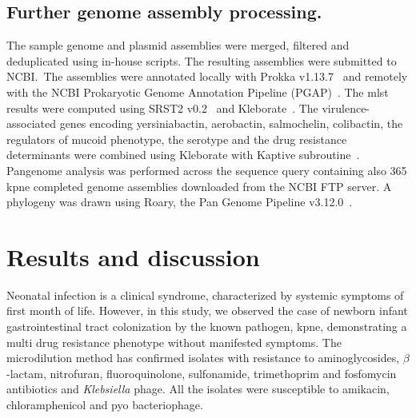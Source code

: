 \documentclass[12pt,a4paper]{article}
\newcommand{\betalactam}{$\beta$-lactam}
\begin{document}
\subsection{Further genome assembly processing.}\label{subsec:proc_ass}
The sample genome and plasmid assemblies were merged, filtered and deduplicated using in-house scripts.
The resulting assemblies were submitted to NCBI.\
The assemblies were annotated locally with Prokka v1.13.7~\cite{Prokka}
and remotely with the NCBI Prokaryotic Genome Annotation Pipeline (PGAP)~\cite{PGAP}.
The \gls{mlst} results were computed using SRST2 v0.2~\cite{SRST2}
and Kleborate~\cite{Kleborate}.
The virulence-associated genes encoding yersiniabactin, aerobactin, salmochelin, colibactin, the regulators of mucoid
phenotype, the serotype and the drug resistance determinants were combined using Kleborate with
Kaptive subroutine~\cite{Kaptive}.
Pangenome analysis was performed across the sequence query containing also 365 \gls{kpne} completed genome assemblies
downloaded from the NCBI FTP server.
A phylogeny was drawn using Roary, the Pan Genome Pipeline v3.12.0~\cite{Roary}.

\section{Results and discussion}\label{sec:res_dis}
Neonatal infection is a clinical syndrome, characterized by systemic symptoms of first month of life.
However, in this study, we observed the case of newborn infant gastrointestinal tract colonization by the known
pathogen, \gls{kpne}, demonstrating a multi drug resistance phenotype without manifested symptoms.
The microdilution method has confirmed isolates with resistance to aminoglycosides, \betalactam,
nitrofuran, fluoroquinolone, sulfonamide, trimethoprim and fosfomycin antibiotics and \textit{Klebsiella} phage.
All the isolates were susceptible to amikacin, chloramphenicol and pyo bacteriophage.
\end{document}
